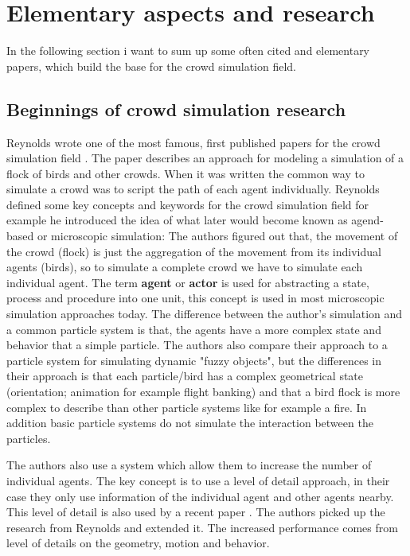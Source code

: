 \documentclass{acmsiggraph}               %
\begin{document}
\section{Elementary aspects and research}
\label{chapter:elementaryPapers}
In the following section i want to sum up some often cited and elementary papers, which build the base for the crowd simulation field.
\subsection{Beginnings of crowd simulation research}

Reynolds  wrote one of the most famous, first published papers for the crowd simulation field . The paper describes an approach for modeling a simulation of a flock of birds and other crowds. When it was written the common way to simulate a crowd was to script the path of each agent individually. Reynolds defined some key concepts and keywords for the crowd simulation field for example he introduced the idea of what later would become known as agend-based or microscopic simulation: The authors figured out that, the movement of the crowd (flock) is just the aggregation of the movement from its individual agents (birds), so to simulate a complete crowd we have to simulate each individual agent.
The term \textbf{agent} or \textbf{actor} is used for abstracting a state, process and procedure into one unit, this concept is used in most microscopic simulation approaches today. The difference between the author's simulation and a common particle system is that, the agents have a more complex state and behavior that a simple particle.
The authors also compare their approach to a particle system for simulating dynamic "fuzzy objects", but the differences in their approach is that each particle/bird has a complex geometrical state (orientation; animation for example flight banking) and that a bird flock is more complex to describe than other particle systems like for example a fire. In addition basic particle systems do not simulate the interaction between the particles.

The authors also use a system which allow them to increase the number of individual agents. The key concept is to use a level of detail approach, in their case they only use information of the individual agent and other agents nearby. This level of detail is also used by a recent paper \cite{osullivan_levels_2002}. The authors picked up the research from Reynolds and extended it. The increased performance comes from level of details on the geometry, motion and behavior.
\end{document}
